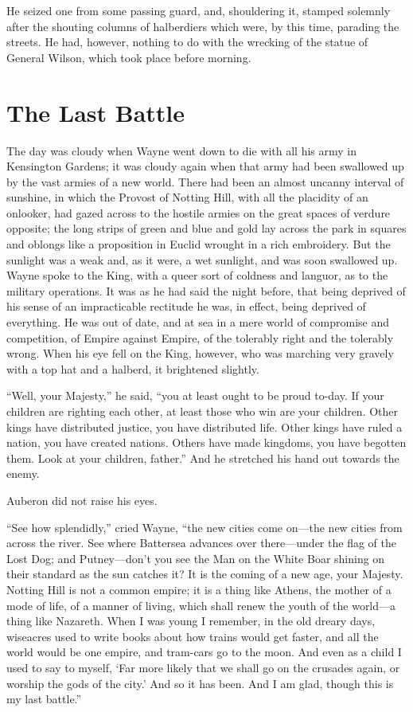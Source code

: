 \documentclass{book}
\begin{document}
He seized one from some passing guard, and, shouldering it, stamped solemnly after the shouting columns of halberdiers which were, by this time, parading the streets. He had, however, nothing to do with the wrecking of the statue of General Wilson, which took place before morning.

\chapter{The Last Battle}
\label{chapter-18}
The day was cloudy when Wayne went down to die with all his army in Kensington Gardens; it was cloudy again when that army had been swallowed up by the vast armies of a new world. There had been an almost uncanny interval of sunshine, in which the Provost of Notting Hill, with all the placidity of an onlooker, had gazed across to the hostile armies on the great spaces of verdure opposite; the long strips of green and blue and gold lay across the park in squares and oblongs like a proposition in Euclid wrought in a rich embroidery. But the sunlight was a weak and, as it were, a wet sunlight, and was soon swallowed up. Wayne spoke to the King, with a queer sort of coldness and languor, as to the military operations. It was as he had said the night before, that being deprived of his sense of an impracticable rectitude he was, in effect, being deprived of everything. He was out of date, and at sea in a mere world of compromise and competition, of Empire against Empire, of the tolerably right and the tolerably wrong. When his eye fell on the King, however, who was marching very gravely with a top hat and a halberd, it brightened slightly.

“Well, your Majesty,” he said, “you at least ought to be proud to-day. If your children are righting each other, at least those who win are your children. Other kings have distributed justice, you have distributed life. Other kings have ruled a nation, you have created nations. Others have made kingdoms, you have begotten them. Look at your children, father.” And he stretched his hand out towards the enemy.

Auberon did not raise his eyes.

“See how splendidly,” cried Wayne, “the new cities come on—the new cities from across the river. See where Battersea advances over there—under the flag of the Lost Dog; and Putney—don’t you see the Man on the White Boar shining on their standard as the sun catches it? It is the coming of a new age, your Majesty. Notting Hill is not a common empire; it is a thing like Athens, the mother of a mode of life, of a manner of living, which shall renew the youth of the world—a thing like Nazareth. When I was young I remember, in the old dreary days, wiseacres used to write books about how trains would get faster, and all the world would be one empire, and tram-cars go to the moon. And even as a child I used to say to myself, ‘Far more likely that we shall go on the crusades again, or worship the gods of the city.’ And so it has been. And I am glad, though this is my last battle.”
\end{document}
